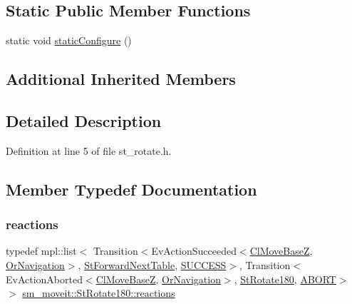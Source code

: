 \subsection*{Static Public Member Functions}
\begin{DoxyCompactItemize}
\item 
static void \hyperlink{structsm__moveit_1_1StRotate180_a7ce91eeeb1a8740e1a6f797a41dc940a}{static\+Configure} ()
\end{DoxyCompactItemize}
\subsection*{Additional Inherited Members}


\subsection{Detailed Description}


Definition at line 5 of file st\+\_\+rotate.\+h.



\subsection{Member Typedef Documentation}
\mbox{\label{structsm__moveit_1_1StRotate180_a1f3d4ae503a581dfffd91742b9c77610}} 
\subsubsection{\texorpdfstring{reactions}{reactions}}
{\footnotesize\ttfamily typedef mpl\+::list$<$ Transition$<$Ev\+Action\+Succeeded$<$\hyperlink{classcl__move__base__z_1_1ClMoveBaseZ}{Cl\+Move\+BaseZ}, \hyperlink{classsm__moveit_1_1OrNavigation}{Or\+Navigation}$>$, \hyperlink{structsm__moveit_1_1StForwardNextTable}{St\+Forward\+Next\+Table}, \hyperlink{classSUCCESS}{S\+U\+C\+C\+E\+SS}$>$, Transition$<$Ev\+Action\+Aborted$<$\hyperlink{classcl__move__base__z_1_1ClMoveBaseZ}{Cl\+Move\+BaseZ}, \hyperlink{classsm__moveit_1_1OrNavigation}{Or\+Navigation}$>$, \hyperlink{structsm__moveit_1_1StRotate180}{St\+Rotate180}, \hyperlink{classABORT}{A\+B\+O\+RT}$>$ $>$ \hyperlink{structsm__moveit_1_1StRotate180_a1f3d4ae503a581dfffd91742b9c77610}{sm\+\_\+moveit\+::\+St\+Rotate180\+::reactions}}




